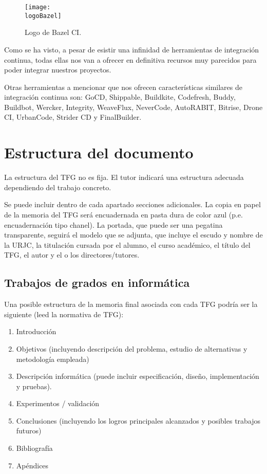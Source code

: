 \begin{figure}[h]
    \centering
    \texttt{[image: \\logoBazel]}
    \caption{Logo de Bazel CI.}
\end{figure}

Como se ha visto, a pesar de esistir una infinidad de herramientas de integración continua, todas ellas nos van a ofrecer en definitiva recursos muy parecidos para poder integrar nuestros proyectos.

Otras herramientas a mencionar que nos ofrecen características similares de integración continua son: GoCD, Shippable, Buildkite, Codefresh, Buddy, Buildbot, Wercker, Integrity, WeaveFlux, NeverCode, AutoRABIT, Bitrise, Drone CI, UrbanCode, Strider CD y FinalBuilder.

\section{Estructura del documento}

La estructura del TFG no es fija. El tutor indicará una estructura adecuada dependiendo del trabajo concreto.

Se puede incluir dentro de cada apartado secciones adicionales. La copia en papel de la memoria del TFG será encuadernada en pasta dura de color azul (p.e. encuadernación tipo chanel). La portada, que puede ser una pegatina transparente, seguirá el modelo que se adjunta, que incluye el escudo y nombre de la URJC, la titulación cursada por el alumno, el curso académico, el título del TFG, el autor y el o los directores/tutores.


\subsection{Trabajos de grados en informática}

Una posible estructura de la memoria final asociada con cada TFG podría ser la siguiente (leed la normativa de TFG):
\begin{enumerate}
 \item Introducción
 \item Objetivos (incluyendo descripción del problema, estudio de alternativas y metodología empleada)
 \item Descripción informática (puede incluir especificación, diseño, implementación y pruebas).
 \item Experimentos / validación
 \item Conclusiones (incluyendo los logros principales alcanzados y posibles trabajos futuros)
 \item Bibliografía
 \item Apéndices
\end{enumerate}
